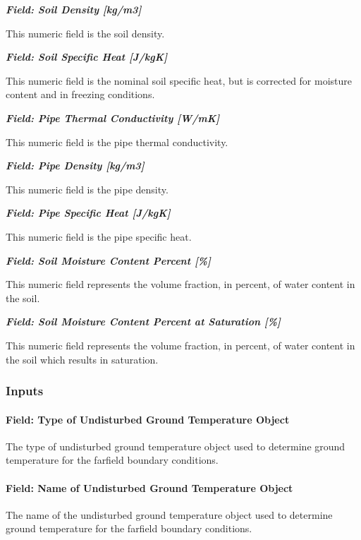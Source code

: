 \textbf{\emph{Field: Soil Density {[}kg/m3{]}}}

This numeric field is the soil density.

\textbf{\emph{Field: Soil Specific Heat {[}J/kgK{]}}}

This numeric field is the nominal soil specific heat, but is corrected for moisture content and in freezing conditions.

\textbf{\emph{Field: Pipe Thermal Conductivity {[}W/mK{]}}}

This numeric field is the pipe thermal conductivity.

\textbf{\emph{Field: Pipe Density {[}kg/m3{]}}}

This numeric field is the pipe density.

\textbf{\emph{Field: Pipe Specific Heat {[}J/kgK{]}}}

This numeric field is the pipe specific heat.

\textbf{\emph{Field: Soil Moisture Content Percent {[}\%{]}}}

This numeric field represents the volume fraction, in percent, of water content in the soil.

\textbf{\emph{Field: Soil Moisture Content Percent at Saturation {[}\%{]}}}

This numeric field represents the volume fraction, in percent, of water content in the soil which results in saturation.

\subsubsection{Inputs}\label{inputs-14-002}

\paragraph{Field: Type of Undisturbed Ground Temperature Object}\label{field-type-of-undisturbed-ground-temperature-object-1}

The type of undisturbed ground temperature object used to determine ground temperature for the farfield boundary conditions.

\paragraph{Field: Name of Undisturbed Ground Temperature Object}\label{field-name-of-undisturbed-ground-temperature-object-1}

The name of the undisturbed ground temperature object used to determine ground temperature for the farfield boundary conditions.

